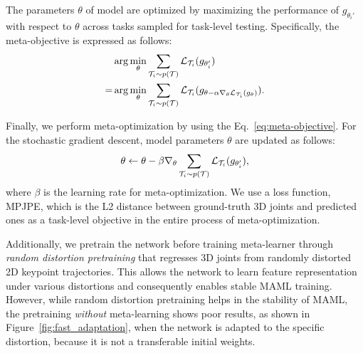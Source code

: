         The parameters $\theta$ of model are optimized by maximizing the performance of $g_{\theta_i'}$ with respect to $\theta$ across tasks sampled for task-level testing. Specifically, the meta-objective is expressed as follows:
        \vspace{-1mm}
        \begin{equation}
            \begin{aligned}
                &\arg \min_{\theta} \sum_{\mathcal{T}_i\sim p(\mathcal{T})} \mathcal{L}_{\mathcal{T}_{i}}(g_{\theta_i'})\\
                =&\arg \min_{\theta} \sum_{\mathcal{T}_i\sim p(\mathcal{T})} \mathcal{L}_{\mathcal{T}_{i}}(g_{\theta - \alpha \nabla_{\theta} \mathcal{L}_{\mathcal{T}_{i}}(g_{\theta})}).
                \label{eq:meta-objective}
            \end{aligned}
            \vspace{-1mm}
        \end{equation}
        
        Finally, we perform meta-optimization by using the Eq.~\ref{eq:meta-objective}. For the stochastic gradient descent, model parameters $\theta$ are updated as follows:
        \vspace{-1mm}
        \begin{equation}
            \theta \leftarrow \theta - \beta \nabla_{\theta} \sum_{\mathcal{T}_{i}\sim p(\mathcal{T})} \mathcal{L}_{\mathcal{T}_i} (g_{\theta_i'}),
            \label{eq:meta-optimization}
            \vspace{-1mm}
        \end{equation}
        where $\beta$ is the learning rate for meta-optimization. We use a loss function, MPJPE, which is the L2 distance between ground-truth 3D joints and predicted ones as a task-level objective in the entire process of meta-optimization.
        
        Additionally, we pretrain the network before training meta-learner through \textit{random distortion pretraining} that regresses 3D joints from randomly distorted 2D keypoint trajectories. This allows the network to learn feature representation under various distortions and consequently enables stable MAML training. However, while random distortion pretraining helps in the stability of MAML, the pretraining \emph{without} meta-learning shows poor results, as shown in Figure~\ref{fig:fast_adaptation}, when the network is adapted to the specific distortion, because it is not a transferable initial weights.
    
